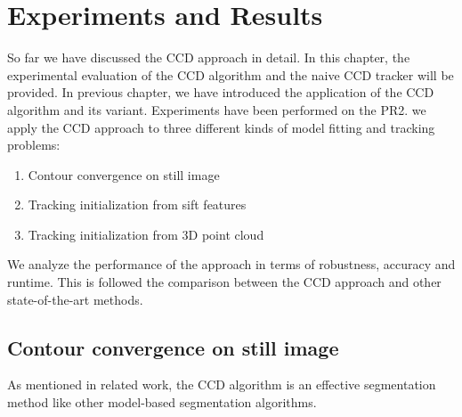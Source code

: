 \chapter{Experiments and Results}
\label{chapter:experiments}

So far we have discussed the CCD approach in detail. In this chapter,
the experimental evaluation of the CCD algorithm and the naive CCD tracker will be provided. In previous
chapter, we have introduced the application of the CCD algorithm and
its variant. Experiments have been performed on the PR2. we apply the
CCD approach to three different kinds of model fitting and tracking
problems:

\begin{enumerate}
\item Contour convergence on still image
\item Tracking initialization from sift features
\item Tracking initialization from 3D point cloud
\end{enumerate}

We analyze the performance of the approach in terms of robustness,
accuracy and runtime. This is followed the comparison between the CCD
approach and  other state-of-the-art methods.

\section{Contour convergence on still image}
\label{sec:ES}

As mentioned in related work, the CCD algorithm is an effective
segmentation method like other model-based segmentation algorithms.

